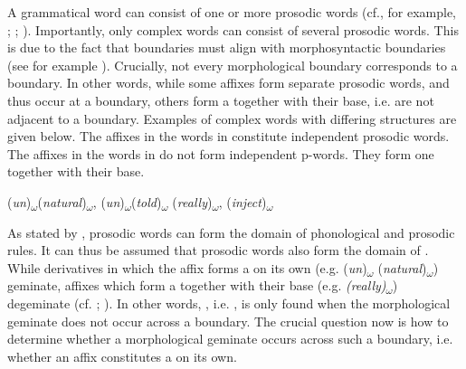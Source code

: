  A grammatical word can consist of one or more prosodic words (cf., for example, \citealt[29]{Booij.1983b}; \citealt[267]{Booij.1985}; \citealt[2]{Hall.2001}). Importantly, only complex words can consist of several prosodic words. This is due to the fact that  boundaries must align with morphosyntactic boundaries (see for example \citealt[2]{Hall.2001}). Crucially, not every morphological boundary corresponds to a  boundary. In other words, while some affixes form separate prosodic words, and thus occur at a  boundary, others form a  together with their base, i.e. are not adjacent to a  boundary. 
Examples of complex words with differing  structures are given below. The affixes in the words in  constitute independent prosodic words. The affixes in the words in  do not form independent p-words. They form one  together with their base. 

\begin{exe}
	\ex\label{ex:4:1} (\textit{un})\textsubscript{$\omega$}(\textit{natural})\textsubscript{$\omega$}, (\textit{un})\textsubscript{$\omega$}(\textit{told})\textsubscript{$\omega$}
	\ex\label{ex:4:2} (\textit{really})\textsubscript{$\omega$}, (\textit{inject})\textsubscript{$\omega$}
\end{exe}


As stated by \citet[3]{Hall.2001}, prosodic words can form the domain of phonological and prosodic rules. It can thus be assumed that prosodic words also form the domain of . While derivatives in which the affix forms a  on its own (e.g. (\textit{un})\textsubscript{$\omega$} (\textit{natural})\textsubscript{$\omega$}) geminate, affixes which form a  together with their base (e.g. \textit{(really)}\textsubscript{$\omega$}) degeminate (cf. \citealt[3543]{Giegerich.2012}; \citealt{Bergmann.}). In other words, , i.e. , is only found when the morphological geminate does not occur across a  boundary. The crucial question now is how to determine whether a morphological geminate occurs across such a boundary, i.e. whether an affix constitutes a  on its own.



